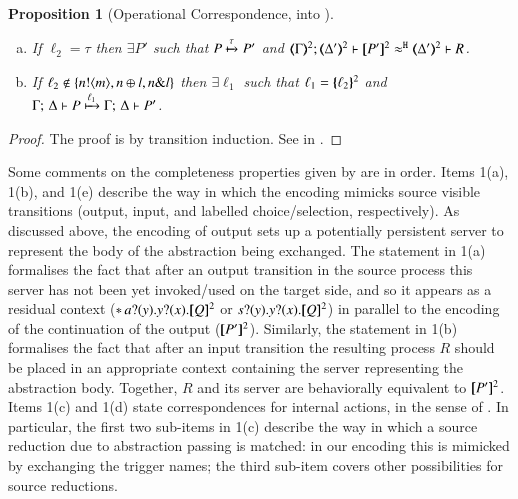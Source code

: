 \documentclass[preprint,11pt]{elsarticle}
\newtheorem{proposition}{Proposition}[section]
\begin{document}
{{\begin{proposition}[Operational Correspondence, \HOp into \sessp]
\begin{enumerate}[1.]
\begin{enumerate}[a)]
				\item   
					If  %
					$\ell_2 = \tau$ 
					then $\exists P'$ such that
					$P \xmapsto{\tau} P'$
					and $\horel{\mapt{\Gamma}^{2}}{\mapt{\Delta'}^{2}}{\map{P'}^{2}}{\hwb}{\mapt{\Delta'}^{2}}{R}$.
				\item	 
					If  
					$\ell_2 \not\in \{n ! \langle m \rangle, n \oplus l, n \& l\}$ 
					 then 
					$\exists \ell_1$ such that 
					$\ell_1 = \{\!\!\{\ell_2\}\!\!\}^{2}$ and \\
					$ \Gamma ;\, \Delta  \vdash   P
					\xmapsto{\ell_1}
					\Gamma ;\, \Delta  \vdash   P'$.
		\end{enumerate}
	\end{enumerate}
\end{proposition}

\begin{proof}
	\noi The proof is by transition induction.
	See  in 
	.
\end{proof}

Some comments on the completeness properties given by  are in order. Items 1(a), 1(b), and 1(e) describe the way in which 
the encoding mimicks source visible transitions (output, input, and labelled choice/selection, respectively). 
As discussed above, the encoding of output 
sets up a potentially persistent server to represent the body of the abstraction being exchanged. 
The statement in 1(a) formalises the fact that 
after an output transition in the source process this server has not been yet invoked/used on the target side, and so it appears as a
residual context ($\ast\,{} a ? (y) . y ? (x) . [\!\![Q]\!\!]^2$ or $s ? (y) . y ? (x) . [\!\![Q]\!\!]^2$)
in parallel to the encoding of the continuation of the output ($[\!\![P']\!\!]^2$).
Similarly, the statement in 1(b) formalises the fact that after an input transition the resulting process $R$ should be 
placed in an appropriate context containing the server representing the abstraction body. 
Together, $R$ and its server are behaviorally equivalent to $[\!\![P']\!\!]^2$.
Items 1(c) and 1(d) state correspondences for internal actions, in the sense of .
In particular, the first two sub-items in 1(c) describe the way in which a source reduction due to abstraction passing is matched: in our encoding
this is mimicked by exchanging the trigger names; the third sub-item covers other possibilities for source reductions. 

}}
\end{document}
